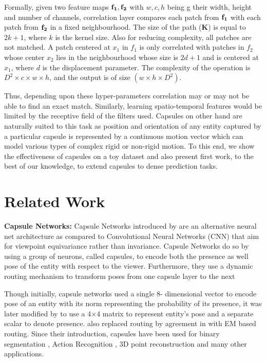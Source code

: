\documentclass[11pt]{article}
\begin{document}
Formally, given two feature maps \(\bf f_{1}, \bf f_{2}\) with \(w,c,h\) being g their width, height and number of channels, correlation layer compares each patch from ${\bf f_{1}}$ with each patch from \(\bf f_{2}\) in a fixed neighbourhood. The size of the path (\textbf{K}) is equal to \(2k + 1\), where \(k\) is the kernel size. Also for reducing complexity, all patches are not matched. A patch centered at \(x_{1}\) in \(f_{1}\) is only correlated with patches in \(f_{2}\) whose center \(x_{2}\) lies in the neighbourhood whose size is ${2d + 1}$ and is centered at \({x_{1}}\), where \({d}\) is the displacement parameter. The complexity of the operation is \({D^{2} × c × w × h}\), and the output is of size \({(w \times h \times D^{2})}\).

Thus, depending upon these hyper-parameters correlation may or may not be able to find an exact match. Similarly, learning spatio-temporal features would be limited
by the receptive field of the filters used. Capsules on other
hand are naturally suited to this task as position and orientation of any entity captured by a particular capsule is represented by a continuous motion vector which can model
various types of complex rigid or non-rigid motion. To this
end, we show the effectiveness of capsules on a toy dataset
and also present first work, to the best of our knowledge, to
extend capsules to dense prediction tasks.

\section{Related Work}

\textbf{Capsule Networks:} Capsule Networks introduced by \cite{14} are an alternative neural net architecture as compared to Convolutional Neural Networks (CNN) that aim for viewpoint equivariance rather than invariance. Capsule Networks do so by using a group of neurons, called capsules, to encode both the presence as well pose of the entity with respect to the viewer. Furthermore, they use a dynamic routing mechanism to transform poses from one capsule layer to the next

Though initially, capsule networks used a single 8- dimensional vector to encode pose of an entity with its norm representing the probability of its presence, it was later modified by \cite{5} to use a 4×4 matrix to represent entity’s pose and a separate scalar to denote presence.  \cite{5} also replaced routing by agreement in \cite{14} with EM based routing. Since their introduction, capsules have been used for binary segmentation \cite{9}, Action Recognition \cite{4}, 3D point reconstruction \cite{19} and many other applications.
\end{document}

